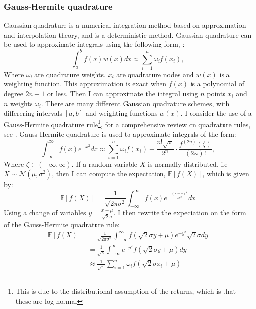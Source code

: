 \documentclass[11pt]{article}
\begin{document}
\subsubsection{Gauss-Hermite quadrature} \label{Subsection: Gauss-Hermite}
Gaussian quadrature is a numerical integration method based on approximation and interpolation theory, and is a deterministic method.
Gaussian quadrature can be used to approximate integrals using the following form, \autocite{Judd1998Book}:
\begin{equation}
  \int_{a}^{b} f(x) w(x) dx \approx \sum_{i=1}^{n} \omega_{i} f(x_{i}),
\end{equation}
Where $\omega_i$ are quadrature weights, $x_i$ are quadrature nodes and $w(x)$ is a weighting function.
This approximation is exact when $f(x)$ is a polynomial of degree $2n-1$ or less.
Then I can approximate the integral using $n$ points $x_i$ and $n$ weights $\omega_i$.
There are many different Gaussian quadrature schemes, with differering intervals $[a,b]$ and weighting functions $w(x)$.
I consider the use of a Gauss-Hermite quadrature rule\footnote{This is due to the distributional assumption of the returns, which is that these are log-normal},
for a comprehensive review on quadrature rules, see \autocite{Judd1998Book}.
Gauss-Hermite quadrature is used to approximate integrals of the form:
\begin{equation}
  \int_{-\infty}^{\infty} f(x) e^{-x^{2}} dx \approx \sum_{i=1}^{n} \omega_{i} f(x_{i}) + \frac{n! \sqrt{\pi}}{2^{n}} 
  \cdot \frac{f^{(2n) }(\zeta )}{(2n)!},
\end{equation}
Where $\zeta \in (-\infty , \infty)$.
If a random variable $X$ is normally distributed, i.e  $X \sim \mathcal{N}(\mu , \sigma^{2})$,
then I can compute the expectation, $\mathbb{E}[f(X)]$, which is given by:
\begin{equation}
  \mathbb{E} [f(X)] =  \frac{1}{\sqrt{2\pi \sigma^{2}} } \int_{-\infty}^{\infty} f(x)  e^{-\frac{(x-\mu)^{2}}{2\sigma^{2}}} dx 
\end{equation}
Using a change of variables $y = \frac{x-\mu}{\sqrt{2}\sigma}$. I then rewrite the expectation on the form of the Gauss-Hermite quadrature rule:
\begin{align}
  \mathbb{E} [f(X)] &=  \frac{1}{\sqrt{2\pi \sigma^{2}} } \int_{-\infty}^{\infty} f( \sqrt{2} \sigma y + \mu)  e^{-y^{2}} \sqrt{2} \sigma dy \\
  &= \frac{1}{\sqrt{\pi}} \int_{-\infty}^{\infty} e^{-y^{2}} f( \sqrt{2} \sigma y + \mu) dy \\
  &\approx \frac{1}{\sqrt{\pi}} \sum_{i=1}^{n} \omega_{i} f( \sqrt{2} \sigma x_{i} + \mu)
\end{align}
\end{document}
